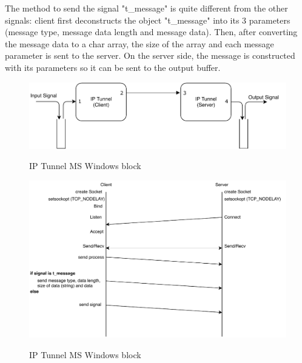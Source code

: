 The method to send the signal "t\_message" is quite different from the other signals: client first deconstructs the object "t\_message" into its 3 parameters (message type, message data length and message data). Then, after converting the message data to a char array, the size of the array and each message parameter is sent to the server. On the server side, the message is constructed with its parameters so it can be sent to the output buffer.

\begin{figure}[h]
	\centering
	\includegraphics[width=1.0\textwidth]{./lib/ip_tunnel_ms_windows/figures/StructureTCPIP4.pdf}
	\label{IP Tunnel Block}\caption{IP Tunnel MS Windows block}
\end{figure}

\begin{figure}[h]
	\centering
	\includegraphics{./lib/ip_tunnel_ms_windows/figures/FluxogramIPTunnel.pdf}
	\label{IP Tunnel Block}\caption{IP Tunnel MS Windows block}
\end{figure}